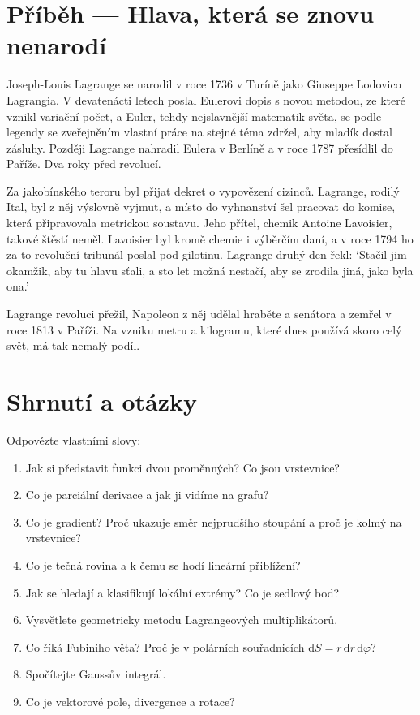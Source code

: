 \section{Příběh --- Hlava, která se znovu nenarodí}

Joseph-Louis Lagrange se narodil v roce 1736 v Turíně jako Giuseppe Lodovico Lagrangia. V devatenácti letech poslal Eulerovi dopis s novou metodou, ze které vznikl variační počet, a Euler, tehdy nejslavnější matematik světa, se podle legendy se zveřejněním vlastní práce na stejné téma zdržel, aby mladík dostal zásluhy. Později Lagrange nahradil Eulera v Berlíně a v roce 1787 přesídlil do Paříže. Dva roky před revolucí.

Za jakobínského teroru byl přijat dekret o vypovězení cizinců. Lagrange, rodilý Ital, byl z něj výslovně vyjmut, a místo do vyhnanství šel pracovat do komise, která připravovala metrickou soustavu. Jeho přítel, chemik Antoine Lavoisier, takové štěstí neměl. Lavoisier byl kromě chemie i výběrčím daní, a v roce 1794 ho za to revoluční tribunál poslal pod gilotinu. Lagrange druhý den řekl: `Stačil jim okamžik, aby tu hlavu sťali, a sto let možná nestačí, aby se zrodila jiná, jako byla ona.'

Lagrange revoluci přežil, Napoleon z něj udělal hraběte a senátora a zemřel v roce 1813 v Paříži. Na vzniku metru a kilogramu, které dnes používá skoro celý svět, má tak nemalý podíl.

\section{Shrnutí a otázky}

\begin{problem}
  Odpovězte vlastními slovy:
  \begin{enumerate}
    \item Jak si představit funkci dvou proměnných? Co jsou vrstevnice?
    \item Co je parciální derivace a jak ji vidíme na grafu?
    \item Co je gradient? Proč ukazuje směr nejprudšího stoupání a proč je kolmý na vrstevnice?
    \item Co je tečná rovina a k čemu se hodí lineární přiblížení?
    \item Jak se hledají a klasifikují lokální extrémy? Co je sedlový bod?
    \item Vysvětlete geometricky metodu Lagrangeových multiplikátorů.
    \item Co říká Fubiniho věta? Proč je v polárních souřadnicích $\mathrm{d}S = r\,\mathrm{d}r\,\mathrm{d}\varphi$?
    \item Spočítejte Gaussův integrál.
    \item Co je vektorové pole, divergence a rotace?
  \end{enumerate}
\end{problem}
